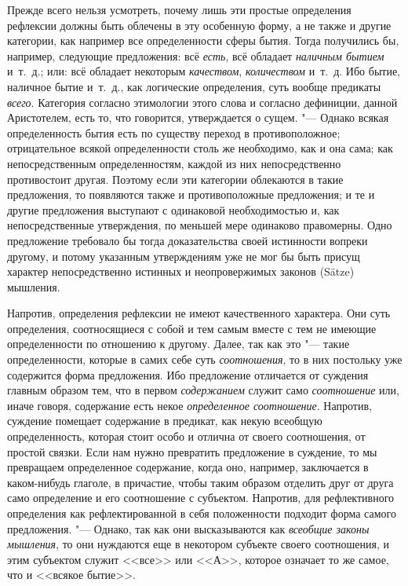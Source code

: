 Прежде всего нельзя усмотреть, почему лишь эти простые определения рефлексии
должны быть облечены в эту особенную форму, а не также и другие категории,
как например все определенности сферы бытия. Тогда получились бы, например,
следующие предложения: всё {\em есть}, всё обладает
{\em наличным бытием} и~т.~д.; или: всё обладает некоторым {\em качеством},
{\em количеством} и~т.~д. Ибо бытие, наличное бытие
и~т.~д., как логические определения, суть вообще предикаты
{\em всего}. Категория согласно этимологии этого слова
и согласно дефиниции, данной Аристотелем, есть то, что говорится,
утверждается о сущем. "--- Однако всякая определенность бытия есть по существу
переход в противоположное; отрицательное всякой определенности столь же
необходимо, как и она сама; как непосредственным определенностям, каждой из
них непосредственно противостоит другая. Поэтому если эти категории
облекаются в такие предложения, то появляются также и противоположные
предложения; и те и другие предложения выступают с одинаковой
необходимостью и, как непосредственные утверждения, по меньшей мере
одинаково правомерны. Одно предложение требовало бы тогда доказательства
своей истинности вопреки другому, и потому указанным утверждениям уже не
мог бы быть присущ характер непосредственно истинных и неопровержимых
законов (Sätze) мышления.

Напротив, определения рефлексии не имеют качественного характера. Они суть
определения, соотносящиеся с собой и тем самым вместе с тем не имеющие
определенности по отношению к другому. Далее, так как это "--- такие
определенности, которые в самих себе суть
{\em соотношения}, то в них постольку уже содержится
форма предложения. Ибо предложение отличается от суждения главным образом
тем, что в первом {\em содержанием} служит само
{\em соотношение} или, иначе говоря, содержание есть
некое {\em определенное соотношение}. Напротив,
суждение помещает содержание в предикат, как некую всеобщую определенность,
которая стоит особо и отлична от своего соотношения, от простой связки.
Если нам нужно превратить предложение в суждение, то мы превращаем
определенное содержание, когда оно, например, заключается в каком-нибудь
глаголе, в причастие, чтобы таким образом отделить друг от друга само
определение и его соотношение с субъектом. Напротив, для рефлективного
определения как рефлектированной в себя положенности подходит форма самого
предложения. "--- Однако, так как они высказываются как
{\em всеобщие законы мышления}, то они нуждаются еще в
некотором субъекте своего соотношения, и этим субъектом служит <<все>> или
<<$А$>>, которое означает то же самое, что и <<всякое бытие>>.

